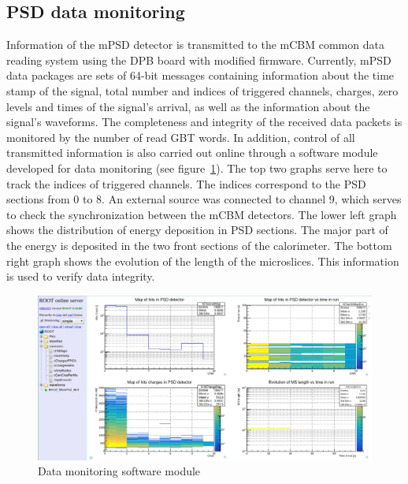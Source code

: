 \documentclass[a4paper,11pt]{article}
\begin{document}
\subsection{PSD data monitoring}
Information of the mPSD detector is transmitted to the mCBM common data reading system using the DPB board with modified firmware. Currently, mPSD data packages are sets of 64-bit messages containing information about the time stamp of the signal, total number and indices of triggered channels, charges, zero levels and times of the signal's arrival, as well as the information about the signal's waveforms.
The completeness and integrity of the received data packets is monitored by the number of read GBT words. In addition, control of all transmitted information is also carried out online through a software module developed for data monitoring (see figure~\ref{fig:5}). The top two graphs serve here to track the indices of triggered channels. The indices correspond to the PSD sections from 0 to 8. An external source was connected to channel 9, which serves to check the synchronization between the mCBM detectors. The lower left graph shows the distribution of energy deposition in PSD sections. The major part of the energy is deposited in the two front sections of the calorimeter. The bottom right graph shows the evolution of the length of the microslices. This information is used to verify data integrity.

\begin{figure}[htbp]
\centering %
\includegraphics[width=\textwidth]{run582.png}
\caption{\label{fig:5} Data monitoring software module}
\end{figure}
\end{document}
